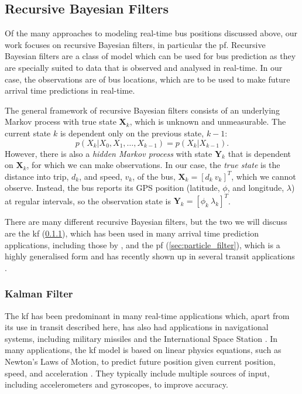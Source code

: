 \documentclass[12pt,a4paper]{article}
\newcommand{\bY}{\mathbf{Y}}
\newcommand{\bX}{\mathbf{X}}
\begin{document}
\subsection{Recursive Bayesian Filters}
\label{sec:recursive}


Of the many approaches to modeling real-time bus positions discussed above,
our work focuses on recursive Bayesian filters, in particular the \gls{pf}.
Recursive Bayesian filters are a class of model which can be used for bus prediction 
as they are specially suited to data that is observed and analysed in real-time.
In our case, the observations are of bus locations,
which are to be used to make future arrival time predictions in real-time.


The general framework of recursive Bayesian filters consists of an
underlying Markov process with true state $\bX_k$, which is unknown and unmeasurable.
The current state $k$ is dependent only on the previous state, $k-1$:
\begin{equation}
  \label{eq:markov_state}
  p(X_k | X_0, X_1, \ldots, X_{k-1}) = p(X_k | X_{k-1}).
\end{equation}
However, there is also a \emph{hidden Markov process}
with state $\bY_k$ that is dependent on $\bX_k$, 
for which we can make observations.
In our case, the \emph{true state} is the distance into trip, $d_k$, 
and speed, $v_k$, of the bus,
$\bX_k = [d_k\ v_k]^T$, which we cannot observe.
Instead, the bus reports its GPS position
(latitude, $\phi$, and longitude, $\lambda$) at regular intervals,
so the observation state is $\bY_k = [\phi_k\ \lambda_k]^T$.


There are many different recursive Bayesian filters,
but the two we will discuss are the \gls{kf} (\cref{sec:kalman_filter}),
which has been used in many arrival time prediction applications,
including those by \cite{cn},
and the \gls{pf} (\cref{sec:particle_filter}), 
which is a highly generalised form and has recently
shown up in several transit applications \citep{cn}.



\subsubsection{Kalman Filter}
\label{sec:kalman_filter}

The \gls{kf} has been predominant in 
many real-time applications which, apart from its use in transit described here,
has also had applications in navigational systems, including military
missiles and the International Space Station \citep{cn}.
In many applications, the \gls{kf} model is based on linear physics equations,
such as Newton's Laws of Motion, to predict future position
given current position, speed, and acceleration \citep{cn}.
They typically include multiple sources of input, 
including accelerometers and gyroscopes, to improve accuracy.
\end{document}
